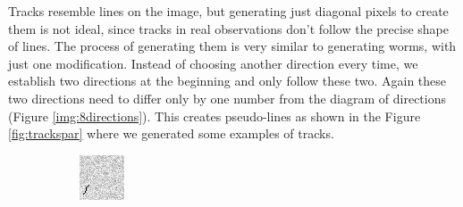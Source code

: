 Tracks resemble lines on the image, but generating just diagonal pixels to create them is not ideal, since tracks in real observations don't follow the precise shape of lines. The process of generating them is very similar to generating worms, with just one modification. Instead of choosing another direction every time, we establish two directions at the beginning and only follow these two. Again these two directions need to differ only by one number from the diagram of directions (Figure \ref{img:8directions}). This creates pseudo-lines as shown in the Figure \ref{fig:trackspar} where we generated some examples of tracks. 

\begin{figure}[!h]
\centering
    \begin{subfigure}[t]{.23\textwidth}
        \centering
        \includegraphics[width=\textwidth]{images/trackA.png}
    \end{subfigure}
    \begin{subfigure}[t]{.23\textwidth}
        \centering

\end{subfigure}
\end{figure}
